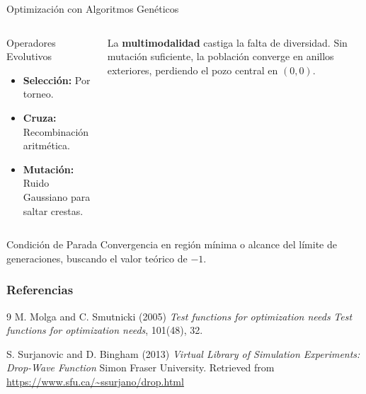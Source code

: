 \documentclass[aspectratio=169,xcolor=dvipsnames]{beamer}
\theoremstyle{definition}
\theoremstyle{remark}
\begin{document}
    \begin{frame}[t]{Optimización con Algoritmos Genéticos}
    \vspace{0.2cm}

    \begin{columns}[t]
        \begin{block}{Operadores Evolutivos}
            \begin{itemize}
                \item \textbf{Selección:} Por torneo.
                \item \textbf{Cruza:} Recombinación aritmética.
                \item \textbf{Mutación:} Ruido Gaussiano para saltar crestas.
            \end{itemize}
        \end{block}

        \begin{tcolorbox}[colback=red!5, colframe=red!75!black, title=Desafío, top=1mm, bottom=1mm]
            \small
            La \textbf{multimodalidad} castiga la falta de diversidad. Sin mutación suficiente, la población converge en anillos exteriores, perdiendo el pozo central en $(0,0)$.
        \end{tcolorbox}
    \end{columns}

    \vspace{0.3cm}

    \begin{block}{Condición de Parada}
        Convergencia en región mínima o alcance del límite de generaciones, buscando el valor teórico de $-1$.
    \end{block}
\end{frame}

\begin{frame}
    \frametitle{Referencias}

    \begin{thebibliography}{9}
        M. Molga and C. Smutnicki (2005)
        \newblock \emph{Test functions for optimization needs}
        \newblock \emph{Test functions for optimization needs}, 101(48), 32.

        S. Surjanovic and D. Bingham (2013)
        \newblock \emph{Virtual Library of Simulation Experiments: Drop-Wave Function}
        \newblock Simon Fraser University. Retrieved from \url{https://www.sfu.ca/~ssurjano/drop.html}
    \end{thebibliography}
\end{frame}
\end{document}
